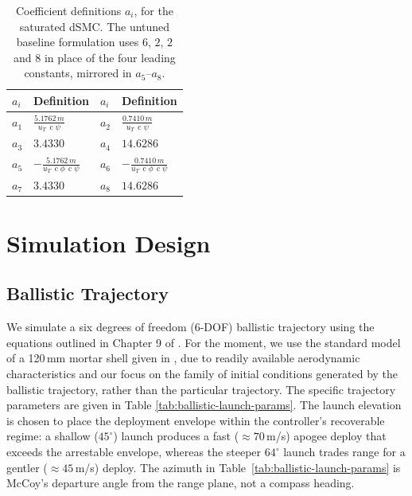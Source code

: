 \documentclass[conf]{new-aiaa}
\DeclareMathOperator{\cs}{c}
\begin{document}
\begingroup
\footnotesize
\setlength{\tabcolsep}{4pt}
\renewcommand{\arraystretch}{1.05}
\begin{table}[t]
\centering
\caption{Coefficient definitions $a_i$, for the saturated dSMC. The untuned baseline formulation uses $6$, $2$, $2$ and $8$ in place of the four leading constants, mirrored in $a_5$--$a_8$.}
\label{tab:a-coeffs}
\begin{tabular}{ll@{\hskip 18pt}ll}
\toprule
$a_i$ & Definition & $a_i$ & Definition \\
\midrule
$a_1$ & $\displaystyle \frac{5.1762\,m}{u_T\,\cs\psi}$
& $a_2$ & $\displaystyle \frac{0.7410\,m}{u_T\,\cs\psi}$ \\
$a_3$ & $3.4330$ & $a_4$ & $14.6286$ \\
$a_5$ & $\displaystyle -\frac{5.1762\,m}{u_T\,\cs\phi\,\cs\psi}$
& $a_6$ & $\displaystyle -\frac{0.7410\,m}{u_T\,\cs\phi\,\cs\psi}$ \\
$a_7$ & $3.4330$ & $a_8$ & $14.6286$ \\
\bottomrule
\end{tabular}
\end{table}
\endgroup

\section{Simulation Design}
\subsection{Ballistic Trajectory}
We simulate a six degrees of freedom (6-DOF) ballistic trajectory using the equations outlined in Chapter 9 of \cite{refs:mccoy1999modern}. For the moment, we use the standard model of a 120\,mm mortar shell given in \cite{refs:mccoy1999modern}, due to readily available aerodynamic characteristics and our focus on the family of initial conditions generated by the ballistic trajectory, rather than the particular trajectory. The specific trajectory parameters are given in Table \ref{tab:ballistic-launch-params}. The launch elevation is chosen to place the deployment envelope within the controller's recoverable regime: a shallow ($45^\circ$) launch produces a fast (${\approx}70$\,m/s) apogee deploy that exceeds the arrestable envelope, whereas the steeper $64^\circ$ launch trades range for a gentler (${\approx}45$\,m/s) deploy. The azimuth in Table~\ref{tab:ballistic-launch-params} is McCoy's departure angle from the range plane, not a compass heading.    
\end{document}

